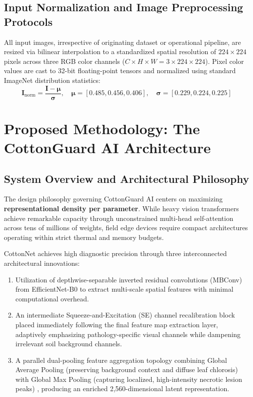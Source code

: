 \documentclass[journal,10pt,twocolumn]{IEEEtran}
\begin{document}
\subsection{Input Normalization and Image Preprocessing Protocols}
All input images, irrespective of originating dataset or operational pipeline, are resized via bilinear interpolation to a standardized spatial resolution of $224 \times 224$ pixels across three RGB color channels ($C \times H \times W = 3 \times 224 \times 224$). Pixel color values are cast to 32-bit floating-point tensors and normalized using standard ImageNet distribution statistics:
\begin{equation}
\mathbf{I}_{\text{norm}} = \frac{\mathbf{I} - \boldsymbol{\mu}}{\boldsymbol{\sigma}}, \quad \boldsymbol{\mu} = [0.485, 0.456, 0.406], \quad \boldsymbol{\sigma} = [0.229, 0.224, 0.225]
\end{equation}

\section{Proposed Methodology: The CottonGuard AI Architecture}

\subsection{System Overview and Architectural Philosophy}
The design philosophy governing CottonGuard AI centers on maximizing \textbf{representational density per parameter}. While heavy vision transformers achieve remarkable capacity through unconstrained multi-head self-attention across tens of millions of weights, field edge devices require compact architectures operating within strict thermal and memory budgets.

CottonNet achieves high diagnostic precision through three interconnected architectural innovations:
\begin{enumerate}[leftmargin=*]
    \item Utilization of depthwise-separable inverted residual convolutions (MBConv) from EfficientNet-B0 \cite{sandler2018mobilenetv2, tan2019efficientnet} to extract multi-scale spatial features with minimal computational overhead.
    \item An intermediate Squeeze-and-Excitation (SE) channel recalibration block \cite{hu2020squeeze} placed immediately following the final feature map extraction layer, adaptively emphasizing pathology-specific visual channels while dampening irrelevant soil background channels.
    \item A parallel dual-pooling feature aggregation topology combining Global Average Pooling (preserving background context and diffuse leaf chlorosis) with Global Max Pooling (capturing localized, high-intensity necrotic lesion peaks) \cite{woo2018cbam}, producing an enriched 2,560-dimensional latent representation.
\end{enumerate}
\end{document}

